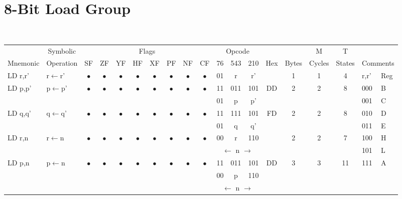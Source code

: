 \documentclass[oneside,a4paper]{book}
\begin{document}
\section{8-Bit Load Group}

{\tt \scriptsize \setlength{\fboxsep}{0.25mm}
\setlength{\tabcolsep}{1mm}
\begin{tabular}{llc@{ }c@{ }c@{ }c@{ }c@{ }c@{ }c@{ }cc@{ }c@{ }cccccll}\hline
 & \multicolumn{1}{c}{Symbolic} & \multicolumn{8}{c}{Flags} & \multicolumn{3}{c}{Opcode} & & & M & T & \\
Mnemonic & \multicolumn{1}{c}{Operation} & SF & ZF & YF & HF & XF & PF & NF & CF & 76 & 543 & 210 
	& Hex & Bytes & Cycles & States & \multicolumn{2}{l}{Comments} \\ \hline

LD r,r'	& r$\leftarrow$r' & 
	$\bullet$ & $\bullet$ & $\bullet$ & $\bullet$ & $\bullet$ & $\bullet$ & $\bullet$ & $\bullet$ & 01 & r & r'
	& & 1 & 1 & 4 & r,r' & Reg\\ \cline{18-19}

LD p,p' & p$\leftarrow$p' & 
	$\bullet$ & $\bullet$ & $\bullet$ & $\bullet$ & $\bullet$ & $\bullet$ & $\bullet$ & $\bullet$ & 11 & 011 & 101
	& DD & 2 & 2 & 8 & 000 & B \\
\multicolumn{10}{c}{} & 01 & p & p' & \multicolumn{4}{c}{} & 001 & C \\

LD q,q' & q$\leftarrow$q' & 
	$\bullet$ & $\bullet$ & $\bullet$ & $\bullet$ & $\bullet$ & $\bullet$ & $\bullet$ & $\bullet$ & 11 & 111 & 101
	& FD & 2 & 2 & 8 & 010 & D \\
\multicolumn{10}{c}{} & 01 & q & q' & \multicolumn{4}{c}{} & 011 & E \\

LD r,n	& r$\leftarrow$n & 
	$\bullet$ & $\bullet$ & $\bullet$ & $\bullet$ & $\bullet$ & $\bullet$ & $\bullet$ & $\bullet$ & 00 & r & 110
	& & 2 & 2 & 7 & 100 & H \\
\multicolumn{10}{c}{} & \multicolumn{3}{c}{$\leftarrow$ n $\rightarrow$} & \multicolumn{4}{c}{} & 101 & L \\

LD p,n	& p$\leftarrow$n & 
	$\bullet$ & $\bullet$ & $\bullet$ & $\bullet$ & $\bullet$ & $\bullet$ & $\bullet$ & $\bullet$ & 11 & 011 & 101
	& DD & 3 & 3 & 11 & 111 & A \\
\multicolumn{10}{c}{} & 00 & p & 110 & \multicolumn{4}{c}{} & & \\
\multicolumn{10}{c}{} & \multicolumn{3}{c}{$\leftarrow$ n $\rightarrow$} & \multicolumn{4}{c}{} & & \\


\end{tabular}}
\end{document}
